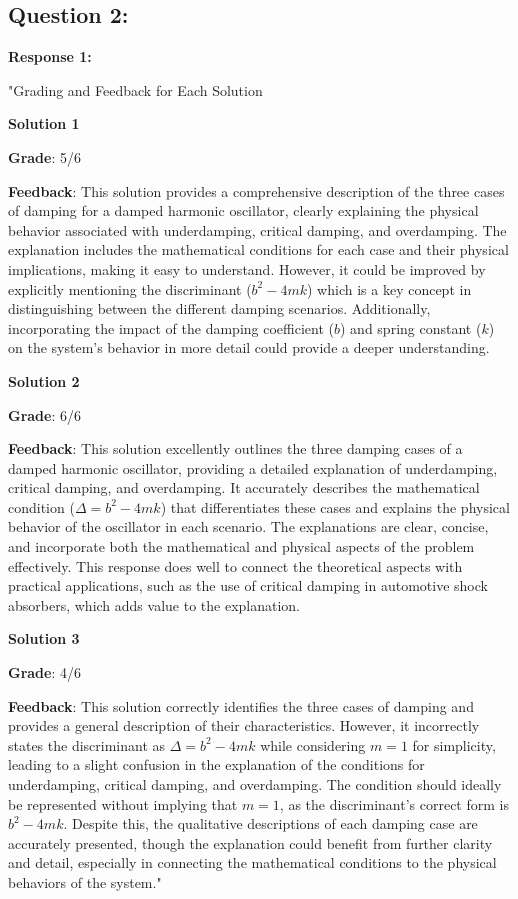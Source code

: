 \documentclass[a4paper,11pt]{article}
\begin{document}
\subsection*{Question 2:}

\textbf{Response 1:}

"Grading and Feedback for Each Solution

\textbf{Solution 1}

\textbf{Grade}: 5/6

\textbf{Feedback}: This solution provides a comprehensive description of the three cases of damping for a damped harmonic oscillator, clearly explaining the physical behavior associated with underdamping, critical damping, and overdamping. The explanation includes the mathematical conditions for each case and their physical implications, making it easy to understand. However, it could be improved by explicitly mentioning the discriminant (\(b^2 - 4mk\)) which is a key concept in distinguishing between the different damping scenarios. Additionally, incorporating the impact of the damping coefficient (\(b\)) and spring constant (\(k\)) on the system's behavior in more detail could provide a deeper understanding.

\textbf{Solution 2}

\textbf{Grade}: 6/6

\textbf{Feedback}: This solution excellently outlines the three damping cases of a damped harmonic oscillator, providing a detailed explanation of underdamping, critical damping, and overdamping. It accurately describes the mathematical condition (\(\Delta = b^2 - 4mk\)) that differentiates these cases and explains the physical behavior of the oscillator in each scenario. The explanations are clear, concise, and incorporate both the mathematical and physical aspects of the problem effectively. This response does well to connect the theoretical aspects with practical applications, such as the use of critical damping in automotive shock absorbers, which adds value to the explanation.

\textbf{Solution 3}

\textbf{Grade}: 4/6

\textbf{Feedback}: This solution correctly identifies the three cases of damping and provides a general description of their characteristics. However, it incorrectly states the discriminant as \(\Delta = b^2 - 4mk\) while considering \(m=1\) for simplicity, leading to a slight confusion in the explanation of the conditions for underdamping, critical damping, and overdamping. The condition should ideally be represented without implying that \(m=1\), as the discriminant's correct form is \(b^2 - 4mk\). Despite this, the qualitative descriptions of each damping case are accurately presented, though the explanation could benefit from further clarity and detail, especially in connecting the mathematical conditions to the physical behaviors of the system."
\end{document}
